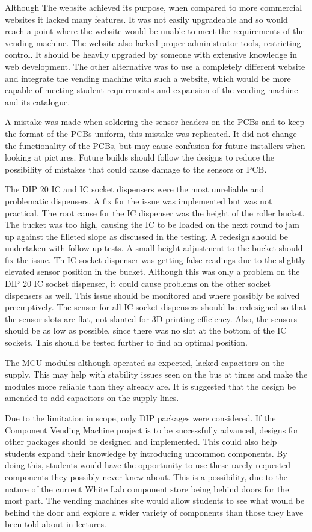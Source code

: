 \documentclass[a4paper,11pt]{article}
\numberwithin{figure}{section}
\numberwithin{table}{section}
\begin{document}
Although The website achieved its purpose, when compared to more commercial websites it lacked many features. It was not easily upgradeable and so would reach a point where the website would be unable to meet the requirements of the vending machine. The website also lacked proper administrator tools, restricting control. It should be heavily upgraded by someone with extensive knowledge in web development. The other alternative was to use a completely different website and integrate the vending machine with such a website, which would be more capable of meeting student requirements and expansion of the vending machine and its catalogue.

A mistake was made when soldering the sensor headers on the PCBs and to keep the format of the PCBs uniform, this mistake was replicated. It did not change the functionality of the PCBs, but may cause confusion for future installers when looking at pictures. Future builds should follow the designs to reduce the possibility of mistakes that could cause damage to the sensors or PCB.

The DIP 20 IC and IC socket dispensers were the most unreliable and problematic dispensers. A fix for the issue was implemented but was not practical. The root cause for the IC dispenser was the height of the roller bucket. The bucket was too high, causing the IC to be loaded on the next round to jam up against the filleted slope as discussed in the testing. A redesign should be undertaken with follow up tests. A small height adjustment to the bucket should fix the issue. Th IC socket dispenser was getting false readings due to the slightly elevated sensor position in the bucket. Although this was only a problem on the DIP 20 IC socket dispenser, it could cause problems on the other socket dispensers as well. This issue should be monitored and where possibly be solved preemptively. The sensor for all IC socket dispensers should be redesigned so that the sensor slots are flat, not slanted for 3D printing efficiency. Also, the sensors should be as low as possible, since there was no slot at the bottom of the IC sockets. This should be tested further to find an optimal position.

The MCU modules although operated as expected, lacked capacitors on the supply. This may help with stability issues seen on the bus at times and make the modules more reliable than they already are. It is suggested that the design be amended to add capacitors on the supply lines.

Due to the limitation in scope, only DIP packages were considered. If the Component Vending Machine project is to be successfully advanced, designs for other packages should be designed and implemented. This could also help students expand their knowledge by introducing uncommon components. By doing this, students would have the opportunity to use these rarely requested components they possibly never knew about. This is a possibility, due to the nature of the current White Lab component store being behind doors for the most part. The vending machines site would allow students to see what would be behind the door and explore a wider variety of components than those they have been told about in lectures.
\end{document}
